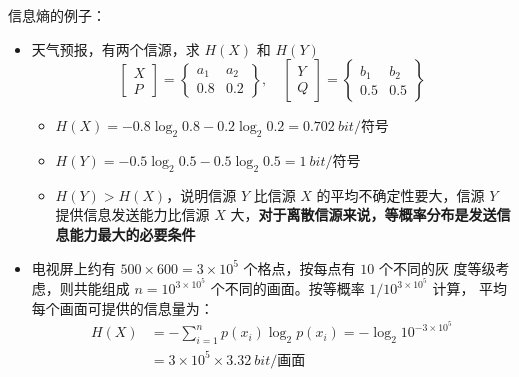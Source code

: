 \begin{remark}
    信息熵的例子：\begin{itemize}
        \item 天气预报，有两个信源，求 $H(X)$ 和 $H(Y)$\[\left[\begin{array}{l}
            X \\
            P
            \end{array}\right]=\left\{\begin{array}{cc}
            a_{1} & a_{2} \\
            0.8 & 0.2
            \end{array}\right\}, \quad\left[\begin{array}{l}
            Y \\
            Q
            \end{array}\right]=\left\{\begin{array}{cc}
            b_{1} & b_{2} \\
            0.5 & 0.5
        \end{array}\right\}\]
        \begin{itemize}
            \item $H(X) = -0.8\log_2 0.8 - 0.2\log_2 0.2 = \SI{0.702}{bit/\text{符号}}$
            \item $H(Y) = -0.5\log_2 0.5 - 0.5\log_2 0.5 = \SI{1}{bit/\text{符号}}$
            \item $H(Y) > H(X)$，说明信源 $Y$ 比信源 $X$ 的平均不确定性要大，信源 $Y$ 提供信息发送能力比信源 $X$ 大，\textbf{对于离散信源来说，等概率分布是发送信息能力最大的必要条件}
        \end{itemize}
        \item 电视屏上约有 $500 \times 600 = 3 \times 10^5$ 个格点，按每点有 $10$ 个不同的灰 度等级考虑，则共能组成 $n = 10^{3 \times 10^5}$ 个不同的画面。按等概率 $1/10^{3 \times 10^5}$ 计算， 平均每个画面可提供的信息量为：\begin{align*}
            H(X) &=-\sum_{i=1}^{n} p(x_{i}) \log_2 p(x_{i})=-\log _{2} 10^{-3 \times 10^{5}} \\
            &=3 \times 10^{5} \times \SI{3.32}{bit / \text{画面}}
        \end{align*}
    \end{itemize}
\end{remark}

